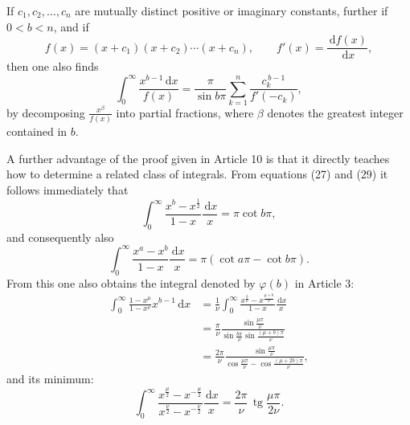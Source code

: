 \documentclass[11pt]{article}
\newcommand{\dd}{\,\mathrm d}
\newcommand{\tg}{\operatorname{tg}}
\begin{document}
If $c_1,c_2,\ldots,c_n$ are mutually distinct positive or imaginary constants, further if $0<b<n$, and if
\[
f(x)=(x+c_1)(x+c_2)\cdots(x+c_n),\qquad
f'(x)=\frac{\dd f(x)}{\dd x},
\]
then one also finds
\begin{equation}
\int_0^\infty\frac{x^{b-1}\dd x}{f(x)}
=\frac{\pi}{\sin b\pi}
 \sum_{k=1}^{n}\frac{c_k^{\,b-1}}{f'(-c_k)},
\tag{34}
\end{equation}
by decomposing $\frac{x^\beta}{f(x)}$ into partial fractions, where $\beta$ denotes the greatest integer contained in $b$.

A further advantage of the proof given in Article 10 is that it directly teaches how to determine a related class of integrals. From equations (27) and (29) it follows immediately that
\[
\int_0^\infty\frac{x^b-x^{\frac12}}{1-x}\frac{\dd x}{x}
=\pi\cot b\pi,
\]
and consequently also
\begin{equation}
\int_0^\infty\frac{x^a-x^b}{1-x}\frac{\dd x}{x}
=\pi(\cot a\pi-\cot b\pi).
\tag{35}
\end{equation}
From this one also obtains the integral denoted by $\varphi(b)$ in Article 3:
\[
\begin{aligned}
\int_0^\infty\frac{1-x^\mu}{1-x^\nu}x^{b-1}\dd x
&=\frac1\nu\int_0^\infty
  \frac{x^{\frac b\nu}-x^{\frac{\mu+b}{\nu}}}{1-x}\frac{\dd x}{x}\\
&=\frac{\pi}{\nu}
  \frac{\sin\frac{\mu\pi}{\nu}}
       {\sin\frac{b\pi}{\nu}\sin\frac{(\mu+b)\pi}{\nu}}\\
&=\frac{2\pi}{\nu}
  \frac{\sin\frac{\mu\pi}{\nu}}
       {\cos\frac{\mu\pi}{\nu}-\cos\frac{(\mu+2b)\pi}{\nu}},
\end{aligned}
\]
and its minimum:
\[
\int_0^\infty
\frac{x^{\frac{\mu}{2}}-x^{-\frac{\mu}{2}}}
     {x^{\frac{\nu}{2}}-x^{-\frac{\nu}{2}}}
\frac{\dd x}{x}
=\frac{2\pi}{\nu}\,\tg\frac{\mu\pi}{2\nu}.
\]
\end{document}
